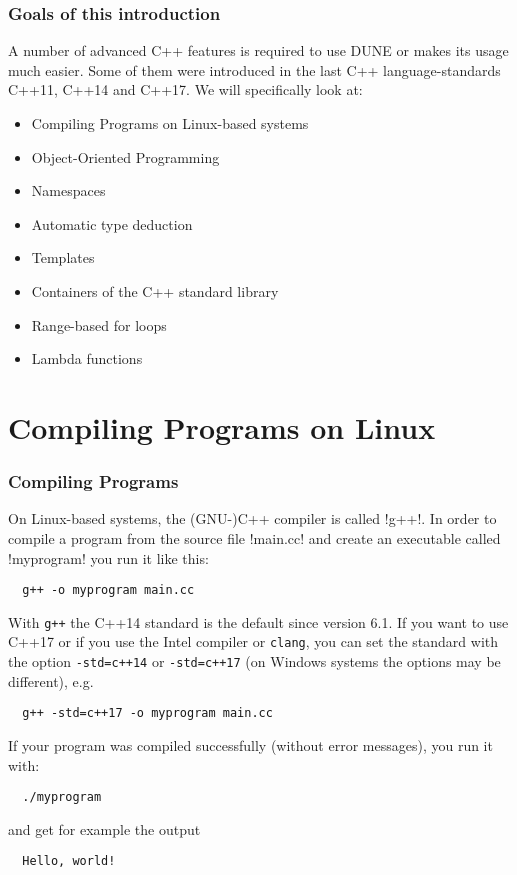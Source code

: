 \begin{frame}
  \frametitle{Goals of this introduction}
  A number of advanced C++ features is required to use DUNE or makes
  its usage much easier. Some of them were introduced in the last
  C++ language-standards  C++11, C++14 and C++17. We will specifically look at:
  \begin{itemize}
  \item Compiling Programs on Linux-based systems
  \item Object-Oriented Programming
  \item Namespaces
  \item Automatic type deduction
  \item Templates
  \item Containers of the C++ standard library
  \item Range-based for loops
  \item Lambda functions
  \end{itemize}
\end{frame}

\section{Compiling Programs on Linux}
\begin{frame}[fragile]
  \frametitle<presentation>{Compiling Programs}
  On Linux-based systems, the (GNU-)C++ compiler is called \inline!g++!. In order to compile a program from the source file \inline!main.cc! and create an executable called \inline!myprogram! you run it like this:
  \begin{lstlisting}
  g++ -o myprogram main.cc
  \end{lstlisting}
With \lstinline!g++! the C++14 standard is the default since version 6.1. If you want to use C++17 or if you use the Intel compiler or \lstinline!clang!, you can set the standard with the option \lstinline!-std=c++14! or \lstinline!-std=c++17! (on Windows systems the options may be different), e.g.
  \begin{lstlisting}
  g++ -std=c++17 -o myprogram main.cc
  \end{lstlisting}

If your program was compiled successfully (without error messages), you run it with:
  \begin{lstlisting}
  ./myprogram
  \end{lstlisting}
and get for example the output
  \begin{lstlisting}
  Hello, world!
  \end{lstlisting}
\end{frame}

